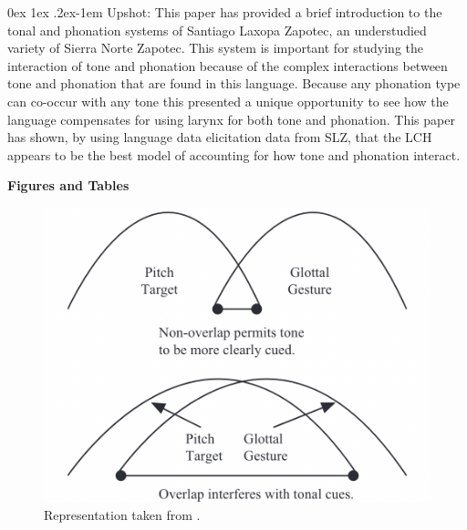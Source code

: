 \documentclass[11pt, letterpaper]{article}
\makeatletter
\renewcommand{\paragraph}{%
  \@startsection{paragraph}{4}%
  {\z@}{0ex \@plus 1ex \@minus .2ex}{-1em}%
  {\normalfont\normalsize\bfseries}%
}
\makeatother
\begin{document}
\paragraph{Upshot:}
This paper has provided a brief introduction to the tonal and phonation systems of Santiago Laxopa Zapotec, an understudied variety of Sierra Norte Zapotec. This system is important for studying the interaction of tone and phonation because of the complex interactions between tone and phonation that are found in this language. Because any phonation type can co-occur with any tone this presented a unique opportunity to see how the language compensates for using larynx for both tone and phonation. This paper has shown, by using language data elicitation data from SLZ, that the LCH \citep{silvermanLaryngealComplexityOtomanguean1997,blankenshipTimeCourseBreathiness1997, blankenshipTimingNonmodalPhonation2002} appears to be the best model of accounting for how tone and phonation interact. 



\newpage
\begin{center}
	\textbf{Figures and Tables}
\end{center}
\thispagestyle{empty}
\begin{figure}[!ht]
	\centering
	\includegraphics[width=.4\textwidth]{../Gestures.png}
	\caption{Representation taken from \citet{dicanioCoarticulationToneGlottal2012}.}
	\label{fig:GlottalGestures}
\end{figure}
\end{document}
